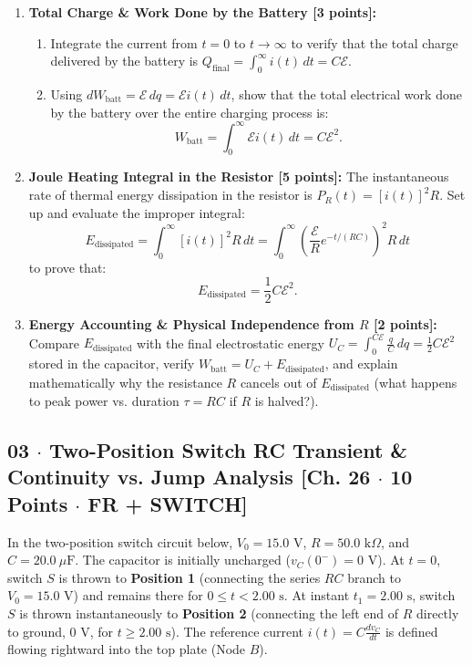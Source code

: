 \documentclass[10pt,letterpaper]{article}
\begin{document}
\begin{enumerate}
  \item \textbf{Total Charge \& Work Done by the Battery [3 points]:}
    \begin{enumerate}
      \item Integrate the current from $t = 0$ to $t \to \infty$ to verify that the total charge delivered by the battery is $Q_{\text{final}} = \int_0^\infty i(t)\,dt = C\mathcal{E}$.
      \item Using $dW_{\text{batt}} = \mathcal{E}\,dq = \mathcal{E} i(t)\,dt$, show that the total electrical work done by the battery over the entire charging process is:
      $$W_{\text{batt}} = \int_{0}^{\infty} \mathcal{E} i(t)\,dt = C\mathcal{E}^2.$$
    \end{enumerate}
  
  \item \textbf{Joule Heating Integral in the Resistor [5 points]:} The instantaneous rate of thermal energy dissipation in the resistor is $P_R(t) = [i(t)]^2 R$. Set up and evaluate the improper integral:
  $$E_{\text{dissipated}} = \int_{0}^{\infty} [i(t)]^2 R\,dt = \int_{0}^{\infty} \left(\frac{\mathcal{E}}{R} e^{-t/(RC)}\right)^2 R\,dt$$
  to prove that:
  $$E_{\text{dissipated}} = \frac{1}{2} C\mathcal{E}^2.$$
  \item \textbf{Energy Accounting \& Physical Independence from $R$ [2 points]:} Compare $E_{\text{dissipated}}$ with the final electrostatic energy $U_C = \int_0^{C\mathcal{E}} \frac{q}{C}\,dq = \frac{1}{2}C\mathcal{E}^2$ stored in the capacitor, verify $W_{\text{batt}} = U_C + E_{\text{dissipated}}$, and explain mathematically why the resistance $R$ cancels out of $E_{\text{dissipated}}$ (what happens to peak power vs. duration $\tau = RC$ if $R$ is halved?).
\end{enumerate}
\vspace{1.2in}


\newpage



\subsection*{03 $\cdot$ Two-Position Switch RC Transient \& Continuity vs. Jump Analysis \hfill [Ch. 26 $\cdot$ 10 Points $\cdot$ FR + SWITCH]}

In the two-position switch circuit below, $V_0 = 15.0\text{ V}$, $R = 50.0\text{ k}\Omega$, and $C = 20.0\ \mu\text{F}$. The capacitor is initially uncharged ($v_C(0^-) = 0\text{ V}$). At $t = 0$, switch $S$ is thrown to \textbf{Position 1} (connecting the series $RC$ branch to $V_0 = 15.0\text{ V}$) and remains there for $0 \le t < 2.00\text{ s}$. At instant $t_1 = 2.00\text{ s}$, switch $S$ is thrown instantaneously to \textbf{Position 2} (connecting the left end of $R$ directly to ground, $0\text{ V}$, for $t \ge 2.00\text{ s}$). The reference current $i(t) = C\frac{dv_C}{dt}$ is defined flowing rightward into the top plate (Node $B$).
\end{document}
